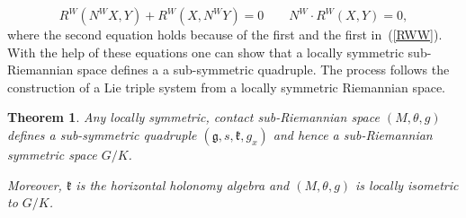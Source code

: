 \documentclass{amsart}
\theoremstyle{plain}
\newtheorem{theorem}{Theorem}[section]
\theoremstyle{definition}
\newcommand{\1}{\mathbf{1}}
\renewcommand{\k}{\mathfrak{k}}
\newcommand{\g}{\mathfrak{g}}
\newcommand{\+}{\oplus}
\begin{document}
\begin{equation}\label{RWR}
R^W(N^WX,Y)+R^W(X,N^WY)=0\qquad N^W\cdot R^W (X,Y) =0,
\end{equation}
where the second equation holds because of the first and the first in~(\ref{RWW}).
With the help of these equations one can show that a locally symmetric sub-Riemannian space defines a a sub-symmetric quadruple. The process follows the construction of a Lie triple system from a locally symmetric Riemannian space. 
\begin{theorem}
Any locally symmetric, contact sub-Riemannian space $(M,\theta, g)$ defines a sub-symmetric quadruple $(\g,s,\k,g_x)$ and hence a sub-Riemannian symmetric space $G/K$. 

Moreover, $\k$ is the horizontal holonomy algebra and $(M,\theta, g)$ is locally isometric to $G/K$.
\end{theorem}
\end{document}

